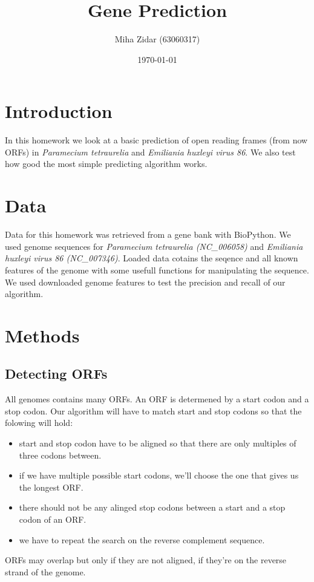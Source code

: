 \documentclass[a4paper,11pt]{article}
\title{Gene Prediction}
\author{Miha Zidar (63060317)}
\date{\today}
\begin{document}
\maketitle

\section{Introduction}

In this homework we look at a basic prediction of open reading frames (from now ORFs) in \textit{Paramecium tetraurelia} and \textit{Emiliania huxleyi virus 86}. We also test how good the most simple predicting algorithm works.

\section{Data}

Data for this homework was retrieved from a gene bank with BioPython. We used genome sequences for \textit{Paramecium tetraurelia (NC\_006058)} and \textit{Emiliania huxleyi virus 86 (NC\_007346)}. Loaded data cotains the seqence and all known features of the genome with some usefull functions for manipulating the sequence. We used downloaded genome features to test the precision and recall of our algorithm.


\section{Methods}

\subsection{Detecting ORFs}
All genomes contains many ORFs. An ORF is determened by a start codon and a stop codon. Our algorithm will have to match start and stop codons so that the folowing will hold:
\begin{itemize}
    \item start and stop codon have to be aligned so that there are only multiples of three codons between. 
    \item if we have multiple possible start codons, we'll choose the one that gives us the longest ORF.
    \item there should not be any alinged stop codons between a start and a stop codon of an ORF.
    \item we have to repeat the search on the reverse complement sequence. 
\end{itemize}
ORFs may overlap but only if they are not aligned, if they're on the reverse strand of the genome.
\end{document}
